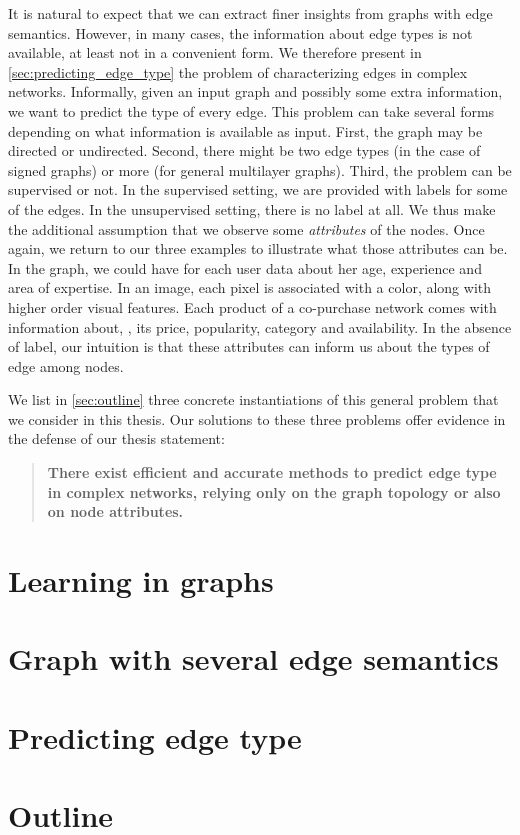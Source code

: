 \medskip

It is natural to expect that we can extract finer insights from graphs with edge semantics. However,
in many cases, the information about edge types is not available, at least not in a convenient form.
We therefore present in
\autoref{sec:predicting_edge_type} the problem of characterizing edges in complex networks.
Informally, given an input graph and possibly some extra information, we want to predict the type of
every edge. This problem can take several forms depending on what information is available as input.
First, the graph may be directed or undirected. Second, there might be two edge types (in the case of
signed graphs) or more (for general multilayer graphs). Third, the problem can be supervised or not.
In the supervised setting, we are provided with labels for some of the edges. In the unsupervised
setting, there is no label at all. We thus make the additional assumption that we observe some
\emph{attributes} of the nodes. Once again, we return to our three examples to illustrate what
those attributes can be. In the \wik{} graph, we could have for each user data about her age, experience and
area of expertise. In an image, each pixel is associated with a color, along with higher order
visual features. Each product of a co-purchase network comes with information about, \eg{}, its price,
popularity, category and availability. In the absence of label, our intuition is that these
attributes can inform us about the types of edge among nodes. 

\medskip

We list in \autoref{sec:outline} three concrete instantiations of this general problem that we
consider in this thesis. Our solutions to these three problems offer evidence in the defense of our
thesis statement:
\begin{quote}
\bf
There exist efficient and accurate methods to predict edge type in complex networks, relying
only on the graph topology or also on node attributes.
\end{quote}

\section{Learning in graphs}
\label{sec:learning_in_graphs}


\section{Graph with several edge semantics}
\label{sec:edge_semantics}


\section{Predicting edge type}
\label{sec:predicting_edge_type}


\section{Outline}
\label{sec:outline}


